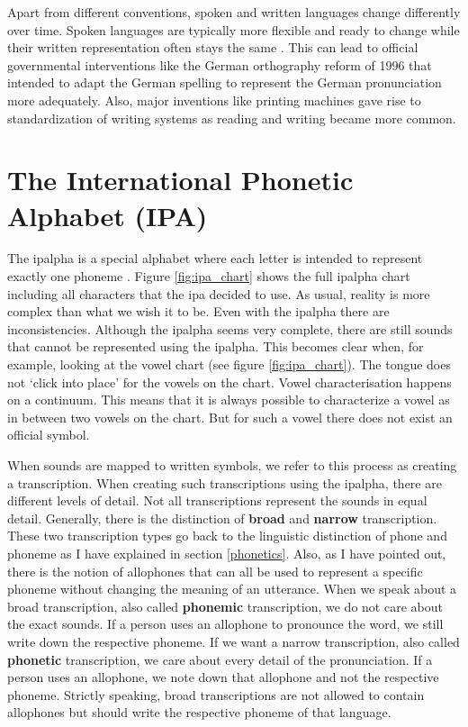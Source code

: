 Apart from different conventions, spoken and written languages change differently over time. Spoken languages are typically more flexible and ready to change while their written representation often stays the same \citep{unicode-lingu}. This can lead to official governmental interventions like the German orthography reform of 1996 that intended to adapt the German spelling to represent the German pronunciation more adequately. Also, major inventions like printing machines gave rise to standardization of writing systems as reading and writing became more common.

\section{The International Phonetic Alphabet (IPA)}
\label{sec:ipa}
The \ac{ipalpha} is a special alphabet where each letter is intended to represent exactly one phoneme \citep{Intro.2007}. Figure \ref{fig:ipa_chart} shows the full \ac{ipalpha} chart including all characters that the \ac{ipa} decided to use. As usual, reality is more complex than what we wish it to be. Even with the \ac{ipalpha} there are inconsistencies. Although the \ac{ipalpha} seems very complete, there are still sounds that cannot be represented using the \ac{ipalpha}. This becomes clear when, for example, looking at the vowel chart (see figure \ref{fig:ipa_chart}). The tongue does not `click into place' for the vowels on the chart. Vowel characterisation happens on a continuum. This means that it is always possible to characterize a vowel as in between two vowels on the chart. But for such a vowel there does not exist an official symbol.

When sounds are mapped to written symbols, we refer to this process as creating a transcription. When creating such transcriptions using the \ac{ipalpha}, there are different levels of detail. Not all transcriptions represent the sounds in equal detail. Generally, there is the distinction of \textbf{broad} and \textbf{narrow} transcription. These two transcription types go back to the linguistic distinction of phone and phoneme as I have explained in section \ref{phonetics}. Also, as I have pointed out, there is the notion of allophones that can all be used to represent a specific phoneme without changing the meaning of an utterance. When we speak about a broad transcription, also called \textbf{phonemic} transcription, we do not care about the exact sounds. If a person uses an allophone to pronounce the word, we still write down the respective phoneme. If we want a narrow transcription, also called \textbf{phonetic} transcription, we care about every detail of the pronunciation. If a person uses an allophone, we note down that allophone and not the respective phoneme. Strictly speaking, broad transcriptions are not allowed to contain allophones but should write the respective phoneme of that language. 

